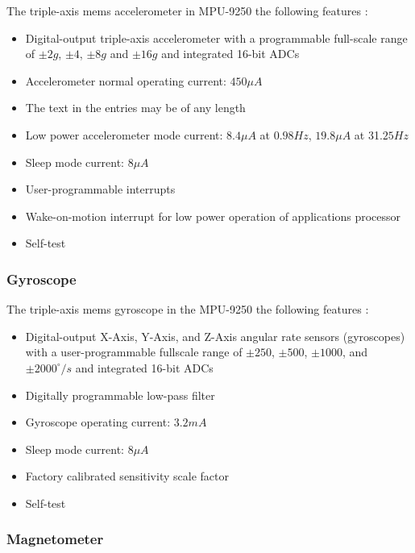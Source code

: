 The triple-axis \acrshort{mems} accelerometer in MPU-9250 the following features \cite{mpu9250specification}:

\begin{itemize}
    \item Digital-output triple-axis accelerometer with a programmable full-scale range  of $\pm 2g$, $\pm 4$, $\pm 8g$ and $\pm 16g$ and integrated 16-bit ADCs
    \item Accelerometer normal operating current: $450 \mu A$
    \item The text in the entries may be of any length
    \item Low power accelerometer mode current: $8.4 \mu A$ at $0.98Hz$, $19.8 \mu A$ at 31.$25Hz$
    \item Sleep mode current: $8 \mu A$
    \item User-programmable interrupts
    \item Wake-on-motion interrupt for low power operation of applications processor
    \item Self-test
\end{itemize}



\subsubsection{Gyroscope}

The triple-axis \acrshort{mems} gyroscope in the MPU-9250 the following features \cite{mpu9250specification}:

\begin{itemize}
    \item Digital-output X-Axis, Y-Axis, and Z-Axis angular rate sensors (gyroscopes) with a user-programmable fullscale range of $\pm 250$, $\pm 500$, $\pm 1000$, and $\pm 2000^{\circ}/s$ and integrated 16-bit ADCs
    \item Digitally programmable low-pass filter
    \item Gyroscope operating current: $3.2mA$
    \item Sleep mode current: $8 \mu A$
    \item Factory calibrated sensitivity scale factor
    \item Self-test
\end{itemize}



\subsubsection{Magnetometer}

